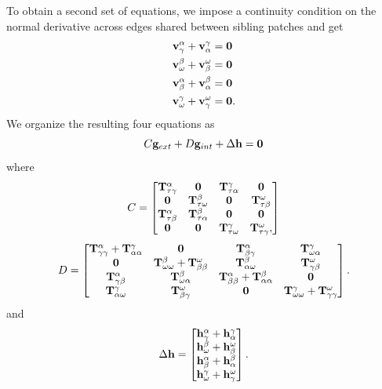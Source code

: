 To obtain a second set of equations, we impose a continuity condition on the normal derivative across edges shared between sibling patches and get
\begin{equation}
\begin{aligned}
\mathbf v^{\alpha}_{\gamma} + \mathbf v^{\gamma}_{\alpha} & = \mathbf 0 \\
\mathbf v^{\beta}_{\omega} + \mathbf v^{\omega}_{\beta} & = \mathbf 0 \\
\mathbf v^{\alpha}_{\beta}  + \mathbf v^{\beta}_{\alpha} & = \mathbf 0\\
\mathbf v^{\gamma}_{\omega} + \mathbf v^{\omega}_{\gamma} & = \mathbf 0.
\end{aligned}
\end{equation}
We organize the resulting four equations as
\begin{equation}
C \mathbf g_{ext} + D\mathbf g_{int}  + \Delta \mathbf h = \mathbf 0
\label{eq:sys_two}
\end{equation}
where
\begin{equation}
C = 
\begin{bmatrix}
\mathbf T^{\alpha}_{\tau\gamma} & \mathbf 0               & \mathbf T^{\gamma}_{\tau\alpha} & \mathbf 0 \\
\mathbf 0               & \mathbf T^{\beta}_{\tau\omega}  & \mathbf 0                & \mathbf T^{\omega}_{\tau\beta} \\ 
\mathbf T^{\alpha}_{\tau\beta}  & \mathbf T^{\beta}_{\tau\alpha} & \mathbf 0                & \mathbf 0 \\
\mathbf 0               & \mathbf 0               & \mathbf T^{\gamma}_{\tau\omega}  & \mathbf T^{\omega}_{\tau\gamma},
\end{bmatrix}
\end{equation}
\begin{equation}
D = \begin{bmatrix}
\Talphap{\gamma}{\gamma} + \Tgammap{\alpha}{\alpha} 
& \zeromat 
& \Talphap{\beta}{\gamma} 
& \Tgammap{\omega}{\alpha} \\
% 
\zeromat 
& \Tbetap{\omega}{\omega} + \Tomegap{\beta}{\beta} 
& \Tbetap{\alpha}{\omega} 
& \Tomegap{\gamma}{\beta} \\
% 
\Talphap{\gamma}{\beta} 
& \Tbetap{\omega}{\alpha} 
& \Talphap{\beta}{\beta}+ \Tbetap{\alpha}{\alpha} 
& \zeromat \\
% 
\Tgammap{\alpha}{\omega} 
& \Tomegap{\beta}{\gamma} 
& \zeromat 
& \Tgammap{\omega}{\omega} + \Tomegap{\gamma}{\gamma}
\end{bmatrix}
\label{eq:matrix_CD}.
\end{equation}
and 
\begin{equation}
\Delta \mathbf h = 
\begin{bmatrix}
\mathbf h^{\alpha}_{\gamma} + \mathbf h^{\gamma}_{\alpha} \\
\mathbf h^{\beta}_{\omega} + \mathbf h^{\omega}_{\beta} \\
\mathbf h^{\alpha}_{\beta} + \mathbf h^{\beta}_{\alpha} \\
\mathbf h^{\gamma}_{\omega} + \mathbf h^{\omega}_{\gamma}
\end{bmatrix}.
\end{equation}

